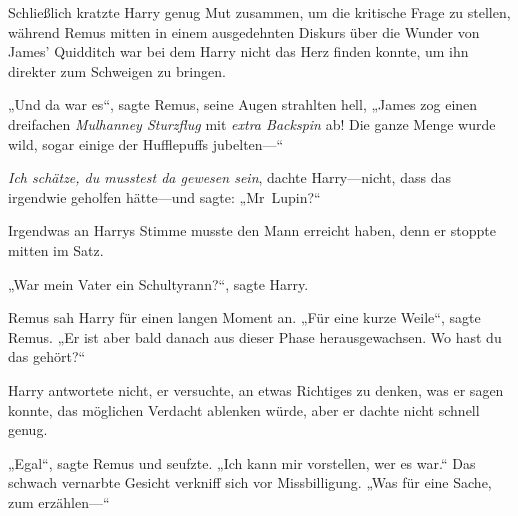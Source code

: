 Schließlich kratzte Harry genug Mut zusammen, um die kritische Frage zu stellen, während Remus mitten in einem ausgedehnten Diskurs über die Wunder von James’ Quidditch war bei dem Harry nicht das Herz finden konnte, um ihn direkter zum Schweigen zu bringen.

„Und da war es“, sagte Remus, seine Augen strahlten hell, „James zog einen dreifachen \emph{Mulhanney Sturzflug} mit \emph{extra Backspin} ab! Die ganze Menge wurde wild, sogar einige der Hufflepuffs jubelten—“

\emph{Ich schätze, du musstest da gewesen sein}, dachte Harry—nicht, dass das irgendwie geholfen hätte—und sagte: „Mr~Lupin?“

Irgendwas an Harrys Stimme musste den Mann erreicht haben, denn er stoppte mitten im Satz.

„War mein Vater ein Schultyrann?“, sagte Harry.

Remus sah Harry für einen langen Moment an. „Für eine kurze Weile“, sagte Remus. „Er ist aber bald danach aus dieser Phase herausgewachsen. Wo hast du das gehört?“

Harry antwortete nicht, er versuchte, an etwas Richtiges zu denken, was er sagen konnte, das möglichen Verdacht ablenken würde, aber er dachte nicht schnell genug.

„Egal“, sagte Remus und seufzte. „Ich kann mir vorstellen, wer es war.“ Das schwach vernarbte Gesicht verkniff sich vor Missbilligung. „Was für eine Sache, zum erzählen—“


